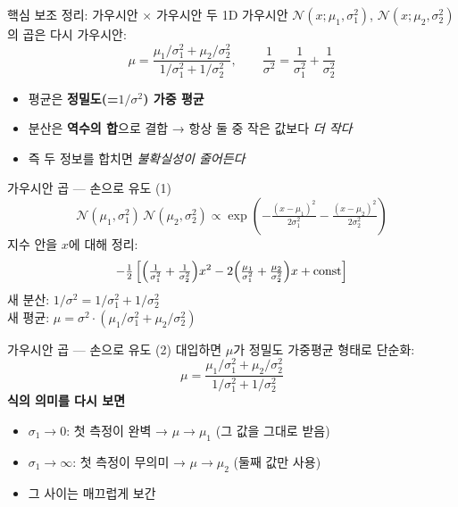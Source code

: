 \begin{frame}{핵심 보조 정리: 가우시안 $\times$ 가우시안}
  두 1D 가우시안 $\mathcal{N}(x;\mu_1,\sigma_1^2)$, $\mathcal{N}(x;\mu_2,\sigma_2^2)$의 곱은 다시 가우시안:
  \[
    \mu = \frac{\mu_1/\sigma_1^2 + \mu_2/\sigma_2^2}{1/\sigma_1^2 + 1/\sigma_2^2},
    \qquad
    \frac{1}{\sigma^2} = \frac{1}{\sigma_1^2} + \frac{1}{\sigma_2^2}
  \]
  \pause
  \vspace{0.4em}
  \begin{itemize}
    \item 평균은 \textbf{정밀도(=$1/\sigma^2$) 가중 평균}
    \item 분산은 \textbf{역수의 합}으로 결합 → 항상 둘 중 작은 값보다 \emph{더 작다}
    \item 즉 두 정보를 합치면 \emph{불확실성이 줄어든다}
  \end{itemize}
\end{frame}

\begin{frame}{가우시안 곱 — 손으로 유도 (1)}
  \footnotesize
  \[
    \mathcal{N}(\mu_1,\sigma_1^2)\,\mathcal{N}(\mu_2,\sigma_2^2)
    \propto \exp\!\left(-\tfrac{(x-\mu_1)^2}{2\sigma_1^2}-\tfrac{(x-\mu_2)^2}{2\sigma_2^2}\right)
  \]
  \pause
  지수 안을 $x$에 대해 정리:
  \[
    -\tfrac{1}{2}\left[\Bigl(\tfrac{1}{\sigma_1^2}+\tfrac{1}{\sigma_2^2}\Bigr) x^2
      - 2\Bigl(\tfrac{\mu_1}{\sigma_1^2}+\tfrac{\mu_2}{\sigma_2^2}\Bigr)x + \text{const}\right]
  \]
  \pause
  새 분산: \;$1/\sigma^2 = 1/\sigma_1^2 + 1/\sigma_2^2$\\
  새 평균: \;$\mu = \sigma^2 \cdot (\mu_1/\sigma_1^2 + \mu_2/\sigma_2^2)$
\end{frame}

\begin{frame}{가우시안 곱 — 손으로 유도 (2)}
  \footnotesize
  대입하면 $\mu$가 정밀도 가중평균 형태로 단순화:
  \[
    \mu = \frac{\mu_1/\sigma_1^2 + \mu_2/\sigma_2^2}{1/\sigma_1^2 + 1/\sigma_2^2}
  \]
  \pause
  \vspace{0.3em}
  \textbf{식의 의미를 다시 보면}
  \begin{itemize}
    \item $\sigma_1 \to 0$: 첫 측정이 완벽 → $\mu \to \mu_1$ (그 값을 그대로 받음)
    \item $\sigma_1 \to \infty$: 첫 측정이 무의미 → $\mu \to \mu_2$ (둘째 값만 사용)
    \item 그 사이는 매끄럽게 보간
  \end{itemize}
\end{frame}

